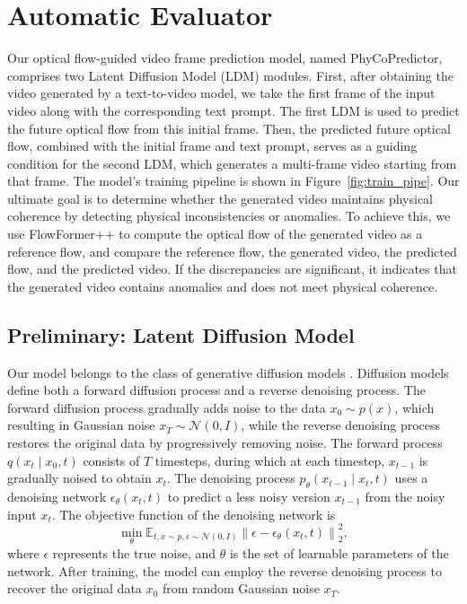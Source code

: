 \section{Automatic Evaluator}



Our optical flow-guided video frame prediction model, named PhyCoPredictor, comprises two Latent Diffusion Model (LDM) modules. First, after obtaining the video generated by a text-to-video model, we take the first frame of the input video along with the corresponding text prompt. The first LDM is used to predict the future optical flow from this initial frame. Then, the predicted future optical flow, combined with the initial frame and text prompt, serves as a guiding condition for the second LDM, which generates a multi-frame video starting from that frame. The model's training pipeline is shown in Figure~\ref{fig:train_pipe}. Our ultimate goal is to determine whether the generated video maintains physical coherence by detecting physical inconsistencies or anomalies. To achieve this, we use FlowFormer++ \cite{shi2023flowformer++} to compute the optical flow of the generated video as a reference flow, and compare the reference flow, the generated video, the predicted flow, and the predicted video. If the discrepancies are significant, it indicates that the generated video contains anomalies and does not meet physical coherence.


\subsection{Preliminary: Latent Diffusion Model}

Our model belongs to the class of generative diffusion models \cite{ho2020denoising}. Diffusion models define both a forward diffusion process and a reverse denoising process. The forward diffusion process gradually adds noise to the data \( x_0 \sim p(x) \), which resulting in Gaussian noise \( x_T \sim \mathcal{N}(0, I) \), while the reverse denoising process restores the original data by progressively removing noise. The forward process \( q(x_t \mid x_0, t) \) consists of \( T \) timesteps, during which at each timestep, \( x_{t-1} \) is gradually noised to obtain \( x_t \). The denoising process \( p_\theta(x_{t-1} \mid x_t, t) \) uses a denoising network \( \epsilon_\theta(x_t, t) \) to predict a less noisy version \( x_{t-1} \) from the noisy input \( x_t \). The objective function of the denoising network is 
\begin{equation}
    \min_{\theta} \mathbb{E}_{t, x \sim p, \epsilon \sim \mathcal{N}(0, I)} \left\| \epsilon - \epsilon_\theta(x_t, t) \right\|_2^2,
\end{equation}
where \( \epsilon \) represents the true noise, and \( \theta \) is the set of learnable parameters of the network. After training, the model can employ the reverse denoising process to recover the original data \( x_0 \) from random Gaussian noise \( x_T \).

